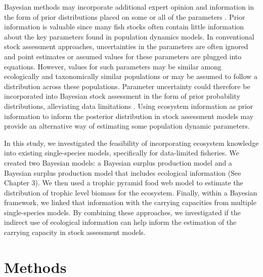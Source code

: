 \documentclass[oneside,12pt,final]{sty/ucthesis-CA2012}
\let\cite\citep                             %
\begin{document}
\begin{mainmatter}
Bayesian methods may incorporate additional expert opinion and information in the form of prior distributions placed on some or all of the parameters \cite{mcallister1998bayesian}. Prior information is valuable since many fish stocks often contain little information about the key parameters found in population dynamics models. In conventional stock assessment approaches, uncertainties in the parameters are often ignored and point estimates or assumed values for these parameters are plugged into equations. However, values for such parameters may be similar among ecologically and taxonomically similar populations or may be assumed to follow a distribution across these populations. Parameter uncertainty could therefore be incorporated into Bayesian stock assessment in the form of prior probability distributions, alleviating data limitations \cite{mcallister1998bayesian}. Using ecosystem information as prior information to inform the posterior distribution in stock assessment models may provide an alternative way of estimating some population dynamic parameters.

\vspace{5mm}

In this study, we investigated the feasibility of incorporating ecosystem knowledge into existing single-species models, specifically for data-limited fisheries. We created two Bayesian models: a Bayesian surplus production model \cite{mcallister1997bayesian} and a Bayesian surplus production model that includes ecological information (See Chapter 3). We then used a trophic pyramid food web model to estimate the distribution of trophic level biomass for the ecosystem. Finally, within a Bayesian framework, we linked that information with the carrying capacities from multiple single-species models. By combining these approaches, we investigated if the indirect use of ecological information can help inform the estimation of the carrying capacity in stock assessment models.  


\section{Methods}

\end{mainmatter}
\end{document}
